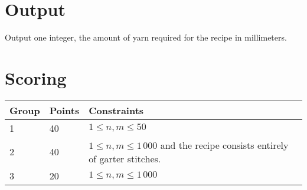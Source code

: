 \section*{Output}
Output one integer, the amount of yarn required for the recipe in millimeters.

\section*{Scoring}
\begin{tabular}{|l|l|l|}
\hline
Group & Points & Constraints \\ \hline
1     & 40     & $1 \leq n, m \leq 50$ \\ \hline
2     & 40     & $1 \leq n, m \leq 1\,000$ and the recipe consists entirely of garter stitches. \\ \hline
3     & 20     & $1 \leq n, m \leq 1\,000$ \\ \hline
\end{tabular}

